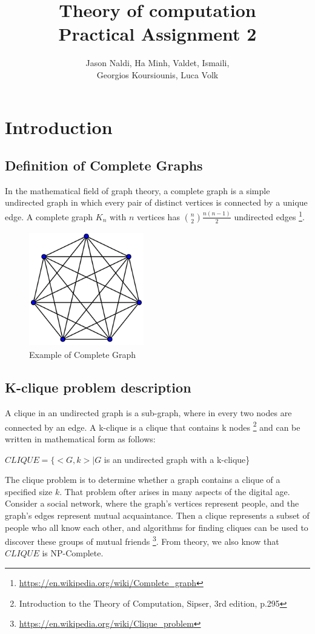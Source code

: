 \documentclass[12pt]{article}
\title{Theory of computation\\ Practical Assignment 2}
\author{Jason Naldi, Ha Minh, Valdet, Ismaili,\\ Georgios Koursiounis, Luca Volk}
\begin{document}
\maketitle

\section{Introduction}
\subsection{Definition of Complete Graphs}

In the mathematical field of graph theory, a complete graph is a simple undirected graph in which every pair of distinct vertices is connected by a unique edge. A complete graph $K_n$ with $n$ vertices has $\binom{n}{2}\frac{n(n-1)}{2}$ undirected edges \footnote{\url{https://en.wikipedia.org/wiki/Complete\_graph}}.

\begin{figure}[ht!]
    \centering
    \includegraphics[width=5cm, height=5cm]{Complete_graph.png}
    \caption{Example of Complete Graph}
\end{figure}

\subsection{K-clique problem description}

A clique in an undirected graph is a sub-graph, where in every two nodes are connected by an edge. A k-clique is a clique that contains k nodes
\footnote{Introduction to the Theory of Computation, Sipser, 3rd edition, p.295}
and can be written in mathematical form as follows:

\begin{center}
$CLIQUE = \{<G, k> | G$ is an undirected graph with a k-clique\}
\end{center}

The clique problem is to determine whether a graph contains a clique of a specified size $k$. That problem ofter arises in many aspects of the digital age. Consider a social network, where the graph's vertices represent people, and the graph's edges represent mutual acquaintance. Then a clique represents a subset of people who all know each other, and algorithms for finding cliques can be used to discover these groups of mutual friends
\footnote{\url{https://en.wikipedia.org/wiki/Clique\_problem}}. From theory, we also know that $CLIQUE$ is NP-Complete.
\end{document}
